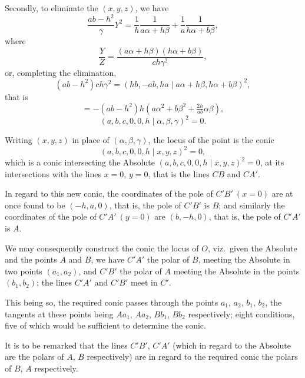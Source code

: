 \documentclass[11pt,a4paper]{article}
\theoremstyle{plain}
\begin{document}
\newpage
\setcounter{equation}{29}

Secondly, to eliminate the $(x, y, z)$, we have
\begin{equation}
\frac{ab-h^2}{\gamma}Y^2 = \frac{1}{h}\frac{1}{a\alpha + h\beta} + \frac{1}{a}\frac{1}{h\alpha + b\beta},
\end{equation}
where
\begin{equation}
\frac{Y}{Z} = \frac{(a\alpha + h\beta)(h\alpha + b\beta)}{ch\gamma^2},
\end{equation}
or, completing the elimination,
\begin{equation}
(ab-h^2)ch\gamma^2 = (hb, -ab, ha \mid a\alpha + h\beta, h\alpha + b\beta)^2,
\end{equation}
that is
\begin{equation}
= -(ab-h^2)h(a\alpha^2 + b\beta^2 + \tfrac{2h}{ab}\alpha\beta),
\end{equation}
\begin{equation}
(a, b, c, 0, 0, h \mid \alpha, \beta, \gamma)^2 = 0.
\end{equation}

Writing $(x, y, z)$ in place of $(\alpha, \beta, \gamma)$, the locus of the point is the conic
\begin{equation}
(a, b, c, 0, 0, h \mid x, y, z)^2 = 0,
\end{equation}
which is a conic intersecting the Absolute $(a, b, c, 0, 0, h \mid x, y, z)^2 = 0$, at its intersections with the lines $x = 0$, $y = 0$, that is the lines $CB$ and $CA'$.

In regard to this new conic, the coordinates of the pole of $C'B'\ (x = 0)$ are at once found to be $(-h, a, 0)$, that is, the pole of $C'B'$ is $B$; and similarly the coordinates of the pole of $C'A'\ (y = 0)$ are $(b, -h, 0)$, that is, the pole of $C'A'$ is $A$.

We may consequently construct the conic the locus of $O$, viz.~given the Absolute and the points $A$ and $B$, we have $C'A'$ the polar of $B$, meeting the Absolute in two points $(a_1, a_2)$, and $C'B'$ the polar of $A$ meeting the Absolute in the points $(b_1, b_2)$; the lines $C'A'$ and $C'B'$ meet in $C'$.

This being so, the required conic passes through the points $a_1$, $a_2$, $b_1$, $b_2$, the tangents at these points being $Aa_1$, $Aa_2$, $Bb_1$, $Bb_2$ respectively; eight conditions, five of which would be sufficient to determine the conic.

It is to be remarked that the lines $C'B'$, $C'A'$ (which in regard to the Absolute are the polars of $A$, $B$ respectively) are in regard to the required conic the polars of $B$, $A$ respectively.
\end{document}
